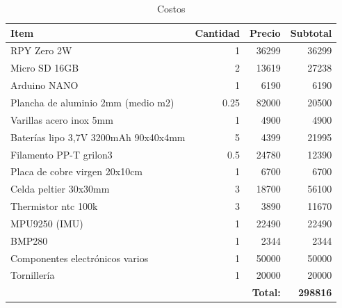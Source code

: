    \begin{table}[H]
     \centering
     \begin{tabular}{|l|r|r|r|}
     \hline
     \textbf{Item} & \textbf{Cantidad} & \textbf{Precio} & \textbf{Subtotal} \\
     \hline
     RPY Zero 2W                            & 1     & 36299  & 36299  \\
     Micro SD 16GB                          & 2     & 13619  & 27238  \\
     Arduino NANO                           & 1     & 6190   & 6190   \\
     Plancha de aluminio 2mm (medio m2)     & 0.25  & 82000  & 20500  \\
     Varillas acero inox 5mm                & 1     & 4900   & 4900   \\
     Baterías lipo 3,7V 3200mAh 90x40x4mm   & 5     & 4399   & 21995  \\
     Filamento PP-T grilon3                 & 0.5   & 24780  & 12390  \\
     Placa de cobre virgen 20x10cm          & 1     & 6700   & 6700   \\
     Celda peltier 30x30mm                  & 3     & 18700  & 56100  \\
     Thermistor ntc 100k                    & 3     & 3890   & 11670  \\
     MPU9250 (IMU)                          & 1     & 22490  & 22490  \\
     BMP280                                 & 1     & 2344   & 2344   \\
     Componentes electrónicos varios        & 1     & 50000  & 50000  \\
     Tornillería                            & 1     & 20000  & 20000  \\
     \hline
     \multicolumn{3}{|r|}{\textbf{Total:}} & \textbf{298816} \\
     \hline
     \end{tabular}
     \caption{Costos}
     \label{tab:costos}
   \end{table}
